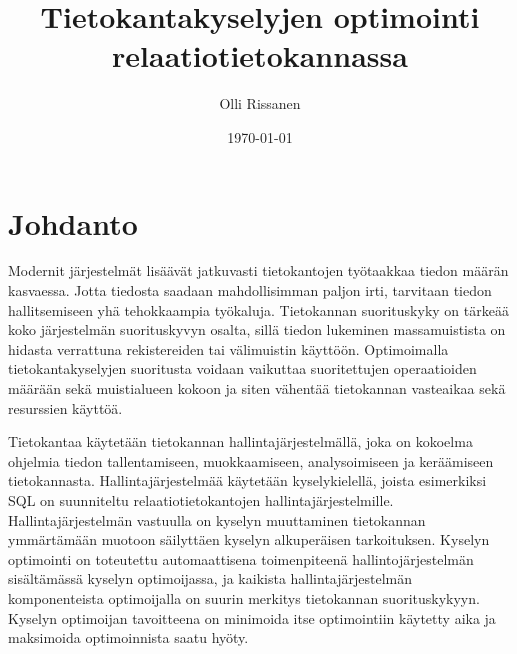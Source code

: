 \documentclass[finnish]{tktltiki2}
\title{Tietokantakyselyjen optimointi relaatiotietokannassa}
\author{Olli Rissanen}
\date{\today}
\theoremstyle{definition}
\theoremstyle{remark}
\begin{document}

\maketitle
\makeabstract
\tableofcontents
\newpage


\section{Johdanto}
Modernit järjestelmät lisäävät jatkuvasti tietokantojen työtaakkaa tiedon määrän kasvaessa. Jotta tiedosta saadaan mahdollisimman paljon irti, tarvitaan tiedon hallitsemiseen yhä tehokkaampia työkaluja. %
Tietokannan suorituskyky on tärkeää koko järjestelmän suorituskyvyn osalta, sillä tiedon lukeminen massamuistista on hidasta verrattuna rekistereiden tai välimuistin käyttöön. Optimoimalla tietokantakyselyjen suoritusta voidaan vaikuttaa suoritettujen operaatioiden määrään sekä muistialueen kokoon ja siten vähentää tietokannan vasteaikaa sekä resurssien käyttöä. \cite{mor2012}
	
% 

Tietokantaa käytetään tietokannan hallintajärjestelmällä, joka on kokoelma ohjelmia tiedon tallentamiseen, muokkaamiseen, analysoimiseen ja keräämiseen tietokannasta. Hallintajärjestelmää käytetään kyselykielellä, joista esimerkiksi SQL \cite{5391051} on suunniteltu relaatiotietokantojen hallintajärjestelmille. Hallintajärjestelmän vastuulla on kyselyn muuttaminen tietokannan ymmärtämään muotoon säilyttäen kyselyn alkuperäisen tarkoituksen. Kyselyn optimointi on toteutettu automaattisena toimenpiteenä hallintojärjestelmän sisältämässä kyselyn optimoijassa, ja kaikista hallintajärjestelmän komponenteista optimoijalla on suurin merkitys tietokannan suorituskykyyn. \cite{mor2012} Kyselyn optimoijan tavoitteena on minimoida itse optimointiin käytetty aika ja maksimoida optimoinnista saatu hyöty. \cite{jarke1984} 
\end{document}
